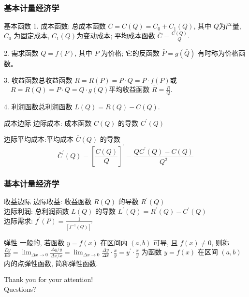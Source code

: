\documentclass[
10pt,
aspectratio=43,
]{beamer}
\begin{document}
\begin{frame}
	\frametitle{基本计量经济学}

	\begin{block}{基本函数}
		1. 成本函数: 总成本函数 $C=C(Q)=C_0+C_1(Q)$, 其中 $Q$为产量, $C_0$ 为固定成本, $C_1(Q)$为变动成本; 平均成本函数 $\bar{C}=\frac{C(Q)}{Q}$.

		2. 需求函数 $Q=f(P)$, 其中 $P$ 为价格; 它的反函数 $\bar{P}=g(\bar{Q})$ 有时称为价格函数。

		3. 收益函数总收益函数 $R=R(P)=P \cdot Q=P \cdot f(P)$或 $\quad R=R(Q)=P \cdot Q=Q \cdot g(Q)$平均收益函数 $\bar{R}=\frac{R}{Q}$.

		4. 利润函数总利润函数 $L(Q)=R(Q)-C(Q)$.
	\end{block}
	\begin{block}{成本边际}
		边际成本: 成本函数 $C(Q)$ 的导数 $C^{\prime}(Q)$

		边际平均成本:平均成本 $\bar{C}(Q)$ 的导数
		$$
			\bar{C}^{\prime}(Q)=\left[\frac{C(Q)}{Q}\right]^{\prime}=\frac{Q C^{\prime}(Q)-C(Q)}{Q^2}
		$$
	\end{block}
\end{frame}

\begin{frame}
	\frametitle{基本计量经济学}
	\everymath{\displaystyle}
	\begin{block}{收益边际}
		边际收益: 收益函数 $R(Q)$ 的导数 $R^{\prime}(Q)$\\

		边际利润: 总利润函数 $L(Q)$ 的导数 $L^{\prime}(Q)=R^{\prime}(Q)-C^{\prime}(Q)$\\

		边际需求:  $f^{\prime}(P)=\frac{1}{\left[f^{-1}(Q)\right]^{\prime}}$
	\end{block}

	\begin{block}{弹性}
		一般的, 若函数 $y=f(x)$ 在区间内 $(a, b)$ 可导, 且 $f(x) \neq 0$, 则称 $\frac{E y}{E x}=\lim _{\Delta x \rightarrow 0} \frac{\Delta y / y}{\Delta x / x}=\lim _{\Delta x \rightarrow 0} \frac{\Delta y}{\Delta x} \cdot \frac{x}{y}=y^{\prime} \cdot \frac{x}{y}$ 为函数 $y=f(x)$ 在区间 $(a, b)$ 内的点弹性函数, 简称弹性函数.
	\end{block}
\end{frame}

\begin{frame}[plain]
	\vfill
	\centering
	{
		\centering \Huge \color{white} Thank you for your attention!\\[10pt]Questions?
	}
	\vfill
\end{frame}
\end{document}
